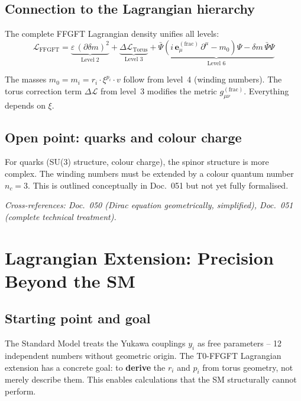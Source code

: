 \subsection{Connection to the Lagrangian hierarchy}

The complete FFGFT Lagrangian density unifies all levels:
\begin{equation}
    \boxed{
    \mathcal{L}_{\mathrm{FFGFT}} =
    \underbrace{\varepsilon\,(\partial\delta m)^2}_{\text{Level 2}}
    + \underbrace{\Delta\mathcal{L}_{\mathrm{Torus}}}_{\text{Level 3}}
    + \underbrace{\bar{\Psi}(i\,\mathbf{e}_\mu^{(\mathrm{frac})}\,\partial^\mu
    - m_0)\Psi - \delta m\,\bar{\Psi}\Psi}_{\text{Level 6}}
    }
\end{equation}

The masses $m_0 = m_i = r_i \cdot \xi^{p_i} \cdot v$ follow from
level~4 (winding numbers). The torus correction term
$\Delta\mathcal{L}$ from level~3 modifies the metric
$g_{\mu\nu}^{(\mathrm{frac})}$. Everything depends on $\xi$.

\subsection{Open point: quarks and colour charge}

For quarks (SU(3) structure, colour charge), the spinor structure
is more complex. The winding numbers must be extended by a colour
quantum number $n_c = 3$. This is outlined conceptually in Doc.~051
but not yet fully formalised.

\noindent\textit{Cross-references: Doc.~050 (Dirac equation geometrically,
simplified), Doc.~051 (complete technical treatment).}

\section{Lagrangian Extension: Precision Beyond the \texorpdfstring{SM}{SM}}

\subsection{Starting point and goal}

The Standard Model treats the Yukawa couplings $y_i$ as free
parameters -- 12 independent numbers without geometric origin.
The T0-FFGFT Lagrangian extension has a concrete goal:
to \textbf{derive} the $r_i$ and $p_i$ from torus geometry,
not merely describe them. This enables calculations that the
SM structurally cannot perform.

